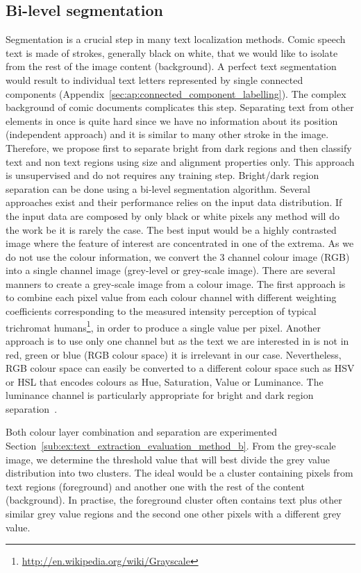 \subsection{Bi-level segmentation}
\label{sec:in:segmentation}
Segmentation is a crucial step in many text localization methods.
Comic speech text is made of strokes, generally black on white, that we would like to isolate from the rest of the image content (background).
A perfect text segmentation would result to individual text letters represented by single connected components (Appendix~\ref{sec:ap:connected_component_labelling}).
The complex background of comic documents complicates this step.
Separating text from other elements in once is quite hard since we have no information about its position (independent approach) and it is similar to many other stroke in the image.
Therefore, we propose first to separate bright from dark regions and then classify text and non text regions using size and alignment properties only.
This approach is unsupervised and do not requires any training step.
Bright/dark region separation can be done using a bi-level segmentation algorithm.
Several approaches exist and their performance relies on the input data distribution.
If the input data are composed by only black or white pixels any method will do the work be it is rarely the case.
The best input would be a highly contrasted image where the feature of interest are concentrated in one of the extrema.
As we do not use the colour information, we convert the 3 channel colour image (RGB) into a single channel image (grey-level or grey-scale image).
There are several manners to create a grey-scale image from a colour image.
The first approach is to combine each pixel value from each colour channel with different weighting coefficients corresponding to the measured intensity perception of typical trichromat humans\footnote{\url{http://en.wikipedia.org/wiki/Grayscale}}, in order to produce a single value per pixel.
Another approach is to use only one channel but as the text we are interested in is not in red, green or blue (RGB colour space) it is irrelevant in our case.
Nevertheless, RGB colour space can easily be converted to a different colour space such as HSV or HSL that encodes colours as Hue, Saturation, Value or Luminance.
The luminance channel is particularly appropriate for bright and dark region separation~\cite{Ho2012}.

Both colour layer combination and separation are experimented Section~\ref{sub:ex:text_extraction_evaluation_method_b}.
From the grey-scale image, we determine the threshold value that will best divide the grey value distribution into two clusters.
The ideal would be a cluster containing pixels from text regions (foreground) and another one with the rest of the content (background).
In practise, the foreground cluster often contains text plus other similar grey value regions and the second one other pixels with a different grey value.


